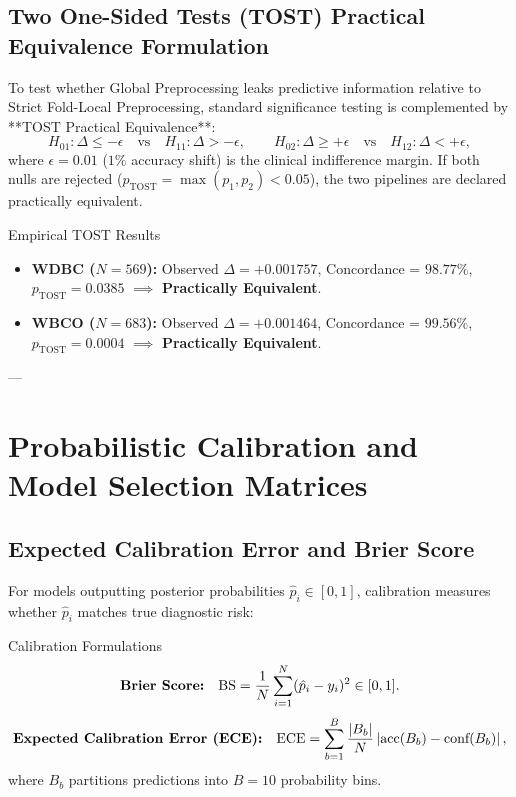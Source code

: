 \documentclass[11pt,a4paper]{article}
\begin{document}
\subsection{Two One-Sided Tests (TOST) Practical Equivalence Formulation}

To test whether Global Preprocessing leaks predictive information relative to Strict Fold-Local Preprocessing, standard significance testing is complemented by **TOST Practical Equivalence**:
\begin{equation}
H_{01}: \Delta \le -\epsilon \quad \text{vs} \quad H_{11}: \Delta > -\epsilon, \qquad H_{02}: \Delta \ge +\epsilon \quad \text{vs} \quad H_{12}: \Delta < +\epsilon,
\end{equation}
where $\epsilon = 0.01$ ($1\%$ accuracy shift) is the clinical indifference margin. If both nulls are rejected ($p_{\text{TOST}} = \max(p_1, p_2) < 0.05$), the two pipelines are declared practically equivalent.

\begin{metricbox}{Empirical TOST Results}
\begin{itemize}[noitemsep]
    \item \textbf{WDBC ($N=569$):} Observed $\Delta = +0.001757$, Concordance = $98.77\%$, $p_{\text{TOST}} = 0.0385$ $\implies$ \textbf{Practically Equivalent}.
    \item \textbf{WBCO ($N=683$):} Observed $\Delta = +0.001464$, Concordance = $99.56\%$, $p_{\text{TOST}} = 0.0004$ $\implies$ \textbf{Practically Equivalent}.
\end{itemize}
\end{metricbox}

---

\section{Probabilistic Calibration and Model Selection Matrices}

\subsection{Expected Calibration Error and Brier Score}

For models outputting posterior probabilities $\hat{p}_i \in [0, 1]$, calibration measures whether $\hat{p}_i$ matches true diagnostic risk:

\begin{metricbox}{Calibration Formulations}
\begin{equation}
\text{\textbf{Brier Score:}} \quad \text{BS} = \frac{1}{N}\sum_{i=1}^N (\hat{p}_i - y_i)^2 \in [0, 1].
\end{equation}
\begin{equation}
\text{\textbf{Expected Calibration Error (ECE):}} \quad \text{ECE} = \sum_{b=1}^B \frac{|B_b|}{N} \left| \text{acc}(B_b) - \text{conf}(B_b) \right|,
\end{equation}
where $B_b$ partitions predictions into $B=10$ probability bins.
\end{metricbox}
\end{document}
